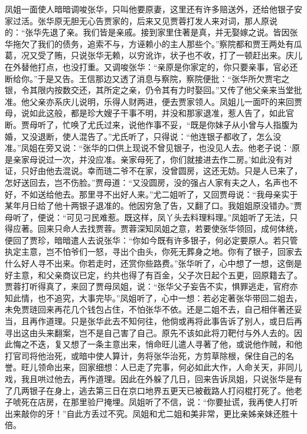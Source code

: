 \begin{parag}
    凤姐一面使人暗暗调唆张华，只叫他要原妻，这里还有许多赔送外，还给他银子安家过活。张华原无胆无心告贾家的，后来又见贾蓉打发人来对词，那人原说的：“张华先退了亲。我们皆是亲戚。接到家里住著是真，并无娶嫁之说。皆因张华拖欠了我们的债务，追索不与，方诬赖小的主人那些个。”察院都和贾王两处有瓜葛，况又受了贿，只说张华无赖，以穷讹诈，状子也不收，打了一顿赶出来。庆儿在外替他打点，也没打重。又调唆张华：“亲原是你家定的，你只要亲事，官必还断给你。”于是又告。王信那边又透了消息与察院，察院便批：“张华所欠贾宅之银，令其限内按数交还，其所定之亲，仍令其有力时娶回。”又传了他父亲来当堂批准。他父亲亦系庆儿说明，乐得人财两进，便去贾家领人。凤姐儿一面吓的来回贾母，说如此这般，都是珍大嫂子干事不明，并没和那家退准，惹人告了，如此官断。贾母听了，忙唤了尤氏过来，说他作事不妥，“既是你妹子从小曾与人指腹为婚，又没退断，使人混告了。”尤氏听了，只得说：“他连银子都收了，怎么没准。”凤姐在旁又说：“张华的口供上现说不曾见银子，也没见人去。他老子说：‘原是亲家母说过一次，并没应准。亲家母死了，你们就接进去作二房。’如此没有对证，只好由他去混说。幸而琏二爷不在家，没曾圆房，这还无妨。只是人已来了，怎好送回去，岂不伤脸。”贾母道：“又没圆房，没的强占人家有夫之人，名声也不好，不如送给他去。那里寻不出好人来。”尤二姐听了，又回贾母说：“我母亲实于某年月日给了他十两银子退准的。他因穷急了告，又翻了口。我姐姐原没错办。”贾母听了，便说：“可见刁民难惹。既这样，凤丫头去料理料理。”凤姐听了无法，只得应著。回来只命人去找贾蓉。贾蓉深知凤姐之意，若要使张华领回，成何体统，便回了贾珍，暗暗遣人去说张华：“你如今既有许多银子，何必定要原人。若只管执定主意，岂不怕爷们一怒，寻出个由头，你死无葬身之地。你有了银子，回家去什么好人寻不出来。你若走时，还赏你些路费。”张华听了，心中想了一想，这倒是好主意，和父亲商议已定，约共也得了有百金，父子次日起个五更，回原籍去了。贾蓉打听得真了，来回了贾母凤姐，说：“张华父子妄告不实，惧罪逃走，官府亦知此情，也不追究，大事完毕。”凤姐听了，心中一想：若必定著张华带回二姐去，未免贾琏回来再花几个钱包占住，不怕张华不依。还是二姐不去，自己相伴著还妥当，且再作道理。只是张华此去不知何往，他倘或再将此事告诉了别人，或日后再寻出这由头来翻案，岂不是自己害了自己。原先不该如此将刀靶付与外人去的。因此悔之不迭，复又想了一条主意出来，悄命旺儿遣人寻著了他，或说他作贼，和他打官司将他治死，或暗中使人算计，务将张华治死，方剪草除根，保住自己的名誉。旺儿领命出来，回家细想：人已走了完事，何必如此大作，人命关天，非同儿戏，我且哄过他去，再作道理。因此在外躲了几日，回来告诉凤姐，只说张华是有了几两银子在身上，逃去第三日在京口地界五更天已被截路人打闷棍打死了。他老子唬死在店房，在那里验尸掩埋。凤姐听了不信，说：“你要扯谎，我再使人打听出来敲你的牙！”自此方丢过不究。凤姐和尤二姐和美非常，更比亲姊亲妹还胜十倍。
\end{parag}


